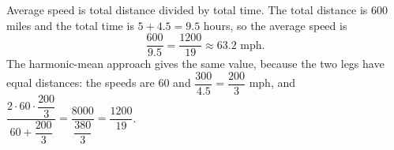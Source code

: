 Average speed is total distance divided by total time. The total distance is $600$ miles and the total time is $5+4.5=9.5$ hours, so the average speed is
\[
\dfrac{600}{9.5}=\boxed{\dfrac{1200}{19}\approx63.2\text{ mph}}.
\]
The harmonic-mean approach gives the same value, because the two legs have equal distances: the speeds are $60$ and $\dfrac{300}{4.5}=\dfrac{200}{3}$ mph, and $\dfrac{2\cdot60\cdot\dfrac{200}{3}}{60+\dfrac{200}{3}}=\dfrac{8000}{\dfrac{380}{3}}=\dfrac{1200}{19}$.
